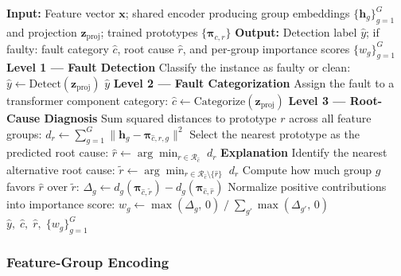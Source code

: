 \begin{algorithm}[!htbp]
\caption{DEFault++ hierarchical diagnosis for one input instance}
\label{alg:defaultpp_inference}
\begin{algorithmic}[1]
\Statex \textbf{Input:} Feature vector $\mathbf{x}$; shared encoder producing group embeddings $\{\mathbf{h}_g\}_{g=1}^{G}$ and projection $\mathbf{z}_{\text{proj}}$; trained prototypes $\{\symbf{\pi}_{c,r}\}$
\Statex \textbf{Output:} Detection label $\hat{y}$; if faulty: fault category $\hat{c}$, root cause $\hat{r}$, and per-group importance scores $\{w_g\}_{g=1}^{G}$
\Statex
\Statex \textbf{Level 1 --- Fault Detection}
\State Classify the instance as faulty or clean: $\hat{y} \gets \text{Detect}(\mathbf{z}_{\text{proj}})$
    \State \Return $\hat{y}$ 
\EndIf
\Statex
\Statex \textbf{Level 2 --- Fault Categorization}
\State Assign the fault to a transformer component category: $\hat{c} \gets \text{Categorize}(\mathbf{z}_{\text{proj}})$
\Statex
\Statex \textbf{Level 3 --- Root-Cause Diagnosis}
    \State Sum squared distances to prototype $r$ across all feature groups: $d_r \gets \sum_{g=1}^{G} \lVert \mathbf{h}_g - \symbf{\pi}_{\hat{c},r,g} \rVert^2$
\EndFor
\State Select the nearest prototype as the predicted root cause: $\hat{r} \gets \arg\min_{r \in \mathcal{R}_{\hat{c}}}\; d_r$
\Statex
\Statex \textbf{Explanation}
\State Identify the nearest alternative root cause: $\tilde{r} \gets \arg\min_{r \in \mathcal{R}_{\hat{c}} \setminus \{\hat{r}\}}\; d_r$
    \State Compute how much group $g$ favors $\hat{r}$ over $\tilde{r}$: $\Delta_g \gets d_g(\symbf{\pi}_{\hat{c},\tilde{r}}) - d_g(\symbf{\pi}_{\hat{c},\hat{r}})$
    \State Normalize positive contributions into importance score: $w_g \gets \max(\Delta_g,\,0)\;/\;\sum_{g'} \max(\Delta_{g'},\,0)$
\EndFor
\State \Return $\hat{y},\; \hat{c},\; \hat{r},\; \{w_g\}_{g=1}^{G}$
\end{algorithmic}
\end{algorithm}

\subsubsection{Feature-Group Encoding}
\label{sec:defaultpp_encoding}

